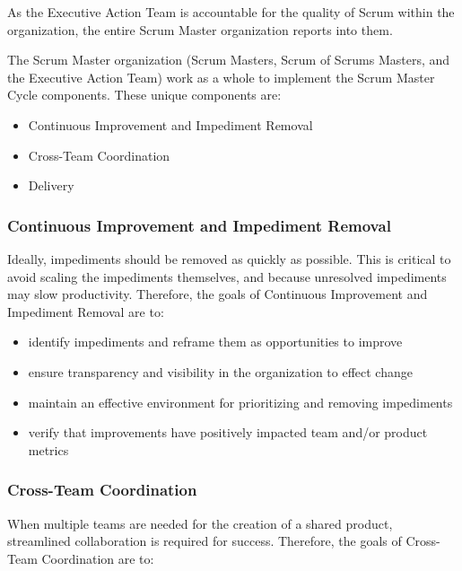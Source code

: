 \documentclass[12pt,a4paper,parskip=full]{scrartcl}
\begin{document}
As the Executive Action Team is accountable for the quality of Scrum
within the organization, the entire Scrum Master organization reports
into them.

The Scrum Master organization (Scrum Masters, Scrum of Scrums Masters,
and the Executive Action Team) work as a whole to implement the Scrum
Master Cycle components. These unique components are:

\begin{itemize}
\itemsep1pt\parskip0pt
\item
  Continuous Improvement and Impediment Removal
\item
  Cross-Team Coordination
\item
  Delivery
\end{itemize}

\subsubsection{Continuous Improvement and Impediment
Removal}\label{Continuous-improvement-and-impediment-removal}

Ideally, impediments should be removed as quickly as possible. This is
critical to avoid scaling the impediments themselves, and because
unresolved impediments may slow productivity. Therefore, the goals of
Continuous Improvement and Impediment Removal are to:

\begin{itemize}
\itemsep1pt\parskip0pt
\item
  identify impediments and reframe them as opportunities to improve
\item
  ensure transparency and visibility in the organization to effect
  change
\item
  maintain an effective environment for prioritizing and removing
  impediments
\item
  verify that improvements have positively impacted team and/or product
  metrics
\end{itemize}

\subsubsection{Cross-Team Coordination}\label{cross-team-coordination}

When multiple teams are needed for the creation of a shared product,
streamlined collaboration is required for success. Therefore, the goals
of Cross-Team Coordination are to:
\end{document}

